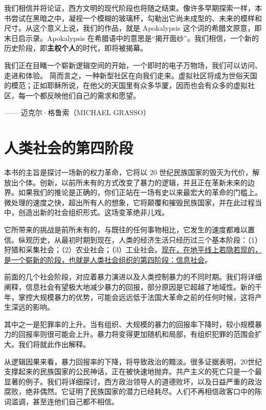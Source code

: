 我们相信并将论证，西方文明的现代阶段也将随之结束。像许多早期探索一样，本书尝试在黑暗之中，凝视一个模糊的玻璃杯，勾勒出它尚未成型的、未来的模样和尺寸。从这个意义上说，我们的作品，就是 Apokalypsis 这个词的希腊文原意，即末日启示录。Apokalypsis 在希腊语中的意思是“揭开面纱”。我们相信，一个新的历史阶段，即\textbf{主权个人}的时代，即将被揭幕。


\begin{tcolorbox}
\kaishu 我们正在目睹一个崭新逻辑空间的开始，一个即时的电子万物场，我们可以访问、走进和体验。
简而言之，一种新型社区在向我们走来。虚拟社区将成为世俗天国的模范；正如耶稣所说，在他父的天国里有众多华厦，因而也会有众多的虚拟社区，每一个都反映他们自己的需求和愿望。
\begin{flushright}
—— 迈克尔·格鲁索（MICHAEL GRASSO）
\end{flushright}
\end{tcolorbox}

\section{人类社会的第四阶段}
本书的主旨是探讨一场新的权力革命，它将以 20 世纪民族国家的毁灭为代价，解放出个体。创新，以前所未有的方式改变了暴力的逻辑，并且正在革新未来的边界。如果我们的推论是正确的，你们正站在一场有史以来最宏大的革命的门槛上。微处理的速度之快，超出所有人的想象，它将颠覆和摧毁民族国家，并在此过程当中，创造出新的社会组织形式。这场变革绝非儿戏。


它所带来的挑战是前所未有的，与既往的任何事物相比，它发生的速度都难以置信。纵观历史，从最初时期到现在，人类的经济生活只经历过三个基本阶段：（1）狩猎和采集社会；（2）农业社会；（3）工业社会。\uline{现在，在地平线上若隐若现的，是一个崭新的阶段，也就是人类社会组织的第四阶段：信息社会}。


前面的几个社会阶段，对应着暴力演进以及人类控制暴力的不同时期。我们将详细阐释，信息社会有望极大地减少暴力的回报，部分原因是它超越了地域性。新的千年，掌控大规模暴力的优势，可能会远远低于法国大革命之前的任何时候，这将产生深远的影响。

其中之一是犯罪率的上升。当有组织、大规模的暴力的回报率下降时，较小规模暴力的回报率则很可能会上升。暴力将变得更加随机和局部，有组织犯罪的范围会扩大。我们将就此作出解释。

从逻辑因果来看，暴力回报率的下降，将导致政治的黯淡。很多证据表明，20世纪支撑起来的民族国家的公民神话，正在被快速地抛弃。共产主义的死亡只是一个最显著的例子。我们将详细探讨，西方政治领导人的道德败坏，以及日益严重的政治腐败，绝非偶然。它证明了民族国家的潜力已经耗尽。人们不再相信政客口中的陈词滥调，甚至连他们自己都不相信。

